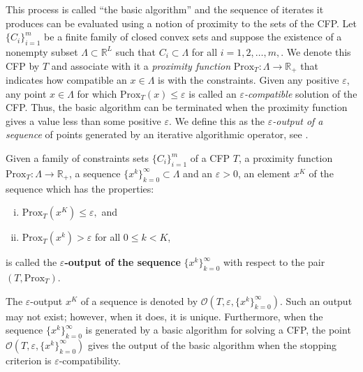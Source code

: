 \documentclass[smallextended]{svjour3}      %
\begin{document}
This process is called ``the basic algorithm'' and the sequence of iterates it produces can be evaluated using a notion of proximity to the sets of the CFP. Let $\lbrace C_{i}\rbrace_{i=1}^{m}$ be a finite family of closed convex sets and suppose the existence of a nonempty subset $\Lambda\subset\mathbb{R}^{L}$ such that $C_{i}\subset\Lambda$ for all $i=1,2,\ldots,m,$. We denote this CFP by $T$ and associate with it a \textit{proximity function} $\mbox{Prox}_{T}:\Lambda\rightarrow\mathbb{R}_{+}$ that indicates how compatible an $x\in\Lambda$ is with the constraints. Given any positive $\varepsilon$, any point $x\in\Lambda$ for which $\mbox{Prox}_{T}(x)\leq\varepsilon$ is called an \textit{$\varepsilon$-compatible} solution of the CFP. Thus, the basic algorithm can be terminated when the proximity function gives a value less than some positive $\varepsilon$. We define this as the \textit{$\varepsilon$-output of a sequence} of points generated by an iterative algorithmic operator, see \cite[page 5]{censor2010perturbation}.
\begin{definition}
	Given a family of constraints sets $\lbrace C_{i}\rbrace_{i=1}^{m}$ of a CFP $T$, a proximity function
	$\mbox{Prox}_{T}:\Lambda\rightarrow\mathbb{R}_{+}$, a sequence $\{x^{k}\}_{k=0}^{\infty}\subset\Lambda$
	and an
 $\varepsilon>0$, an element $x^{K}$ of the sequence which has the
	properties:
	\begin{enumerate}[i)]
		\item
			$\mbox{Prox}_{T}(x^{K})\leq\varepsilon,$ and
		\item
			$\mbox{Prox}_{T}(x^{k})>\varepsilon$ for all $0\leq k<K$,
	\end{enumerate}
	is called the \textbf{$\varepsilon$-output of the sequence} $\{x^{k}\}_{k=0}^{\infty}$
	with respect to the pair $(T,\mbox{Prox}_{T})$.
\end{definition}
The $\varepsilon$-output $x^{K}$ of a sequence is denoted by $\mathcal{O}\left(T,\varepsilon,\lbrace x^{k}\rbrace_{k=0}^{\infty}\right)$. Such an output may not exist; however, when it does, it is unique. Furthermore, when the sequence $\lbrace x^{k}\rbrace_{k=0}^{\infty}$ is generated by a basic algorithm for solving a CFP, the point $\mathcal{O}\left(T,\varepsilon,\lbrace x^{k}\rbrace_{k=0}^{\infty}\right)$ gives the output of the basic algorithm when the stopping criterion is $\varepsilon$-compatibility.
\end{document}
